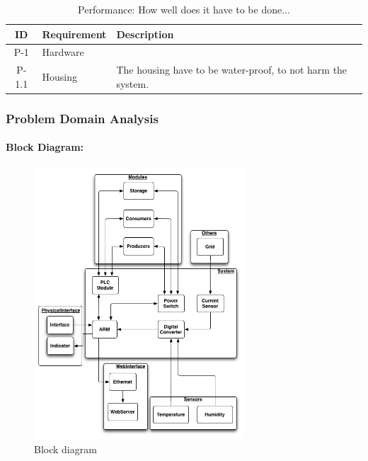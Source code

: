		\begin{table}[H]
			\begin{tabular} [b] {| c | p{3cm} | p{10cm} |}
			\hline
			\textbf{ID} & \textbf{Requirement} & \textbf{Description} \\\hline
			P-1 & Hardware 		&  \\ \hline
			P-1.1 & Housing 		& The housing have to be water-proof, to not harm the system.\\ \hline
		\end{tabular}
		\caption{Performance: How well does it have to be done...}
		\end{table}
	\subsubsection{Problem Domain Analysis}
			\paragraph{Block Diagram:}
			\begin{figure}[H]		%
				\begin{centering}
					 \includegraphics[width=0.7\textwidth]{images/block_diagram.png}
		 			\caption{Block diagram}
			 	\end{centering}
			\end{figure}
			
